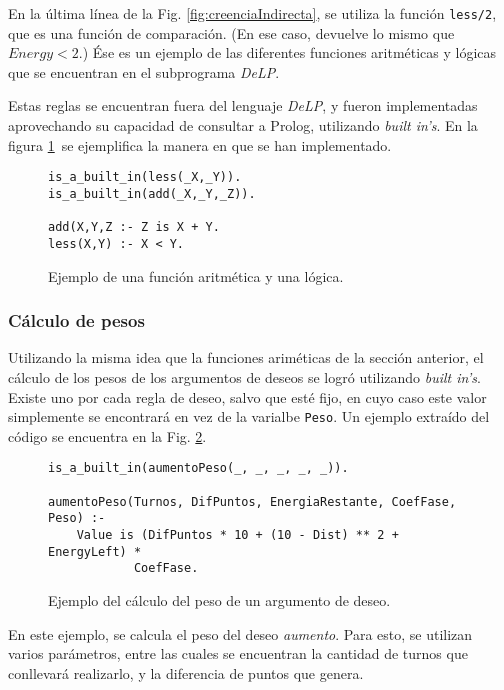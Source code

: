 \documentclass[oneside]{book}
\begin{document}
En la última línea de la Fig. \ref{fig:creenciaIndirecta}, se utiliza la función 
\texttt{less/2}, que es una función de comparación. (En ese caso, devuelve lo mismo
que $Energy < 2$.) Ése es un ejemplo de las diferentes funciones aritméticas y 
lógicas que se encuentran en el subprograma \textit{DeLP}.

Estas reglas se encuentran fuera del lenguaje \textit{DeLP}, y fueron implementadas 
aprovechando su capacidad de consultar a Prolog, utilizando \textit{built in's}.
En la figura \ref{fig:funciones}\ se ejemplifica la manera en que se han 
implementado.

\begin{figure}
\begin{verbatim}    
is_a_built_in(less(_X,_Y)).
is_a_built_in(add(_X,_Y,_Z)).

add(X,Y,Z :- Z is X + Y.
less(X,Y) :- X < Y.
\end{verbatim}

\caption{Ejemplo de una función aritmética y una lógica.}
\label{fig:funciones}
\end{figure}

\subsubsection{Cálculo de pesos}

Utilizando la misma idea que la funciones ariméticas de la sección anterior, el
cálculo de los pesos de los argumentos de deseos se logró utilizando \textit{built 
in's}. Existe uno por cada regla de deseo, salvo que esté fijo, en cuyo caso 
este valor simplemente se encontrará en vez de la varialbe \texttt{Peso}. Un 
ejemplo extraído del código se encuentra en la Fig. \ref{fig:calculoDePeso}.

\begin{figure}
\begin{verbatim}
is_a_built_in(aumentoPeso(_, _, _, _, _)).

aumentoPeso(Turnos, DifPuntos, EnergiaRestante, CoefFase, Peso) :-
    Value is (DifPuntos * 10 + (10 - Dist) ** 2 + EnergyLeft) * 
    		CoefFase.
\end{verbatim}

\caption{Ejemplo del cálculo del peso de un argumento de deseo.}
\label{fig:calculoDePeso}
\end{figure}

En este ejemplo, se calcula el peso del deseo \emph{aumento}. Para esto, se utilizan
varios parámetros, entre las cuales se encuentran la cantidad de turnos que 
conllevará realizarlo, y la diferencia de puntos que genera.
\end{document}
